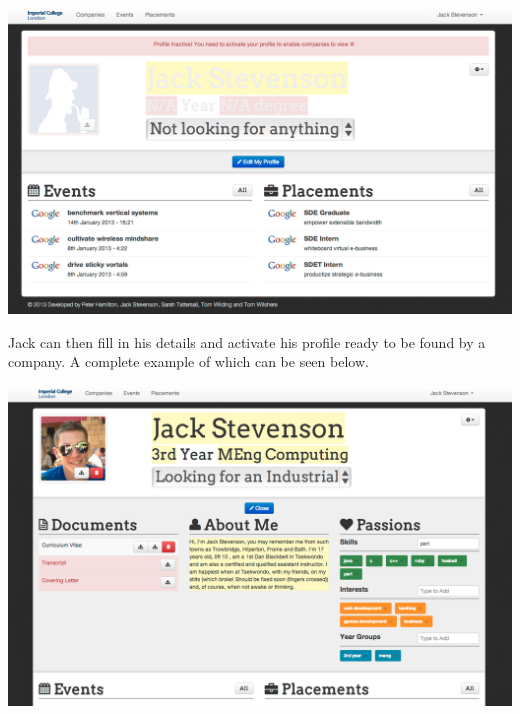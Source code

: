     \includegraphics[scale=0.3]{images/user_experiences/student/sign_up_deactivate}

    Jack can then fill in his details and activate his profile ready to be found by a company.
    A complete example of which can be seen below.

    \includegraphics[scale=0.3]{images/user_experiences/student/edit_complete}

